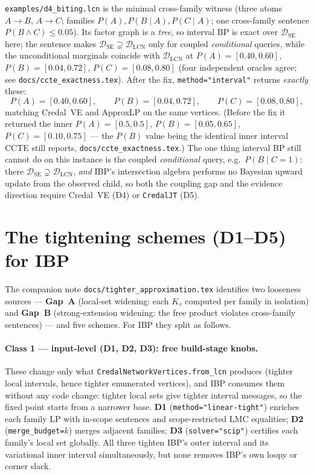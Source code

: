 \documentclass[11pt]{article}
\newcommand{\DSE}{\mathcal{D}_{\mathrm{SE}}}
\newcommand{\DLCN}{\mathcal{D}_{\mathrm{LCN}}}
\begin{document}
\texttt{examples/d4\_biting.lcn} is the minimal cross-family witness (three atoms $A\to B$, $A\to C$;
families $P(A),P(B\mid A),P(C\mid A)$; one cross-family sentence $P(B\land C)\le0.05$). Its factor
graph is a \emph{tree}, so interval BP is exact over $\DSE$ here; the sentence makes
$\DSE\supsetneq\DLCN$ only for coupled \emph{conditional} queries, while the unconditional marginals
coincide with $\DLCN$ at $P(A)=[0.40,0.60]$, $P(B)=[0.04,0.72]$, $P(C)=[0.08,0.80]$ (four independent
oracles agree; see \texttt{docs/ccte\_exactness.tex}). After the fix, \texttt{method="interval"}
returns \emph{exactly} these:
\[
  P(A){=}[0.40,0.60],\qquad P(B){=}[0.04,0.72],\qquad P(C){=}[0.08,0.80],
\]
matching Credal~VE and ApproxLP on the same vertices. (Before the fix it returned the inner
$P(A){=}[0.5,0.5]$, $P(B){=}[0.05,0.65]$, $P(C){=}[0.10,0.75]$ --- the $P(B)$ value being the
identical inner interval CCTE still reports, \texttt{docs/ccte\_exactness.tex}.) The one thing
interval BP still cannot do on this instance is the coupled \emph{conditional} query, e.g.\ $P(B\mid
C{=}1)$: there $\DSE\supsetneq\DLCN$, \emph{and} IBP's intersection algebra performs no Bayesian
upward update from the observed child, so both the coupling gap and the evidence direction require
Credal~VE (D4) or \texttt{CredalJT} (D5).

\section{The tightening schemes (D1--D5) for IBP}\label{sec:schemes}

The companion note \texttt{docs/tighter\_approximation.tex} identifies two looseness sources ---
\textbf{Gap~A} (local-set widening: each $K_v$ computed per family in isolation) and \textbf{Gap~B}
(strong-extension widening: the free product violates cross-family sentences) --- and five schemes.
For IBP they split as follows.

\paragraph{Class 1 --- input-level (D1, D2, D3): free build-stage knobs.} These change only what
\texttt{CredalNetworkVertices.from\_lcn} produces (tighter local intervals, hence tighter enumerated
vertices), and IBP consumes them without any code change: tighter local sets give tighter interval
messages, so the fixed point starts from a narrower base. \textbf{D1} (\texttt{method="linear-tight"})
enriches each family LP with in-scope sentences and scope-restricted LMC equalities;
\textbf{D2} (\texttt{merge\_budget=$k$}) merges adjacent families; \textbf{D3} (\texttt{solver="scip"})
certifies each family's local set globally. All three tighten IBP's outer interval and its
variational inner interval simultaneously, but none removes IBP's own loopy or corner slack.
\end{document}
